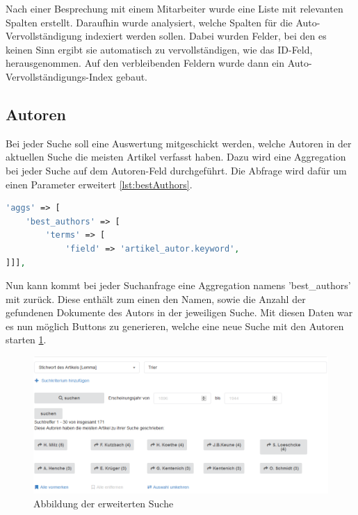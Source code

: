 Nach einer Besprechung mit einem Mitarbeiter wurde eine Liste mit relevanten Spalten erstellt. Daraufhin wurde analysiert, welche Spalten für die Auto-Vervollständigung indexiert werden sollen. Dabei wurden Felder, bei den es keinen Sinn ergibt sie automatisch zu vervollständigen, wie das ID-Feld, herausgenommen. Auf den verbleibenden Feldern wurde dann ein Auto-Vervollständigungs-Index gebaut.

\subsection{Autoren}

Bei jeder Suche soll eine Auswertung mitgeschickt werden, welche Autoren in der aktuellen Suche die meisten Artikel verfasst haben. Dazu wird eine Aggregation bei jeder Suche auf dem Autoren-Feld durchgeführt. Die Abfrage wird dafür um einen Parameter erweitert \ref{lst:bestAuthors}.

\begin{lstlisting}[language=PHP, frame=single, label={lst:bestAuthors}] 
'aggs' => [
    'best_authors' => [
        'terms' => [
            'field' => 'artikel_autor.keyword',
]]],
\end{lstlisting}


Nun kann kommt bei jeder Suchanfrage eine Aggregation namens 'best\_authors' mit zurück. Diese enthält zum einen den Namen, sowie die Anzahl der gefundenen Dokumente des Autors in der jeweiligen Suche. 
Mit diesen Daten war es nun möglich Buttons zu generieren, welche eine neue Suche mit den Autoren starten \ref{img:erweiterteSuche}.


\begin{figure}
	\centering
	\includegraphics[width=1\linewidth]{images/best_authors.png}
	\caption{Abbildung der erweiterten Suche}
	\label{img:erweiterteSuche}
\end{figure}
